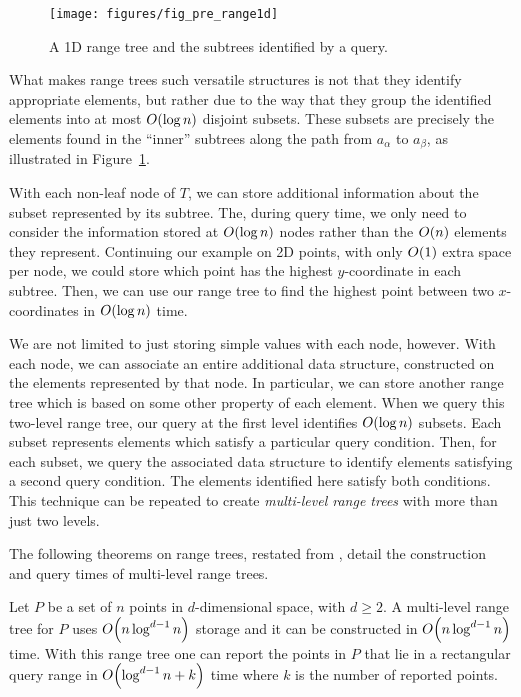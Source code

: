 \begin{figure}
\begin{center}
  \texttt{[image: figures/fig\_pre\_range1d]}
  \caption{A 1D range tree and the subtrees identified by a query.}
  \label{fig:pre:range1d}
\end{center}
\end{figure}

What makes range trees such versatile structures is not that they identify appropriate elements, but rather due to the way that they group the identified elements into at most $O\!\left(\log{n}\right)$ disjoint subsets.
These subsets are precisely the elements found in the ``inner'' subtrees along the path from $a_\alpha$ to $a_\beta$, as illustrated in Figure~\ref{fig:pre:range1d}.

With each non-leaf node of $T$, we can store additional information about the subset represented by its subtree.  The, during query time, we only need to consider the information stored at $O\!\left(\log{n}\right)$ nodes rather than the $O\!\left(n\right)$ elements they represent. Continuing our example on 2D points, with only $O\!\left(1\right)$ extra space per node, we could store which point has the highest $y$-coordinate in each subtree.  Then, we can use our range tree to find the highest point between two $x$-coordinates in $O\!\left(\log{n}\right)$ time.

We are not limited to just storing simple values with each node, however. With each node, we can associate an entire additional data structure, constructed on the elements represented by that node. In particular, we can store another range tree which is based on some other property of each element.  When we query this two-level range tree, our query at the first level identifies $O\!\left(\log{n}\right)$ subsets. Each subset represents elements which satisfy a particular query condition. Then, for each subset, we query the associated data structure to identify elements satisfying a second query condition.  The elements identified here satisfy both conditions. This technique can be repeated to create \emph{multi-level range trees} with more than just two levels.

The following theorems on range trees, restated from \cite{debergch5}, detail the construction and query times of multi-level range trees.

\begin{theorem}
\label{th:rangetree}
Let $P$ be a set of $n$ points in $d$-dimensional space, with $d \geq 2$. A multi-level range tree for $P$ uses $O\!\left(n \log^{d-1}{n}\right)$ storage and it can be constructed in $O\!\left(n \log^{d-1}{n}\right)$ time. With this range tree one can report the points in $P$ that lie in a rectangular query range in $O\!\left(\log^{d-1}{n} + k\right)$ time where $k$ is the number of reported points.
\end{theorem}

